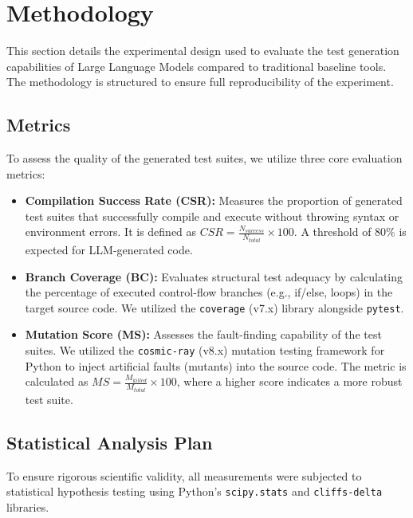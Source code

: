 \section{Methodology}
\label{sec:methodology}

This section details the experimental design used to evaluate the test generation capabilities of Large Language Models compared to traditional baseline tools. The methodology is structured to ensure full reproducibility of the experiment.

\subsection{Metrics}
\label{subsec:metrics}

To assess the quality of the generated test suites, we utilize three core evaluation metrics:

\begin{itemize}
    \item \textbf{Compilation Success Rate (CSR):} Measures the proportion of generated test suites that successfully compile and execute without throwing syntax or environment errors. It is defined as $CSR = \frac{N_{success}}{N_{total}} \times 100$. A threshold of $80\%$ is expected for LLM-generated code.
    \item \textbf{Branch Coverage (BC):} Evaluates structural test adequacy by calculating the percentage of executed control-flow branches (e.g., if/else, loops) in the target source code. We utilized the \texttt{coverage} (v7.x) library alongside \texttt{pytest}.
    \item \textbf{Mutation Score (MS):} Assesses the fault-finding capability of the test suites. We utilized the \texttt{cosmic-ray} (v8.x) mutation testing framework for Python to inject artificial faults (mutants) into the source code. The metric is calculated as $MS = \frac{M_{killed}}{M_{total}} \times 100$, where a higher score indicates a more robust test suite. \cite{demillo1978hints}
\end{itemize}

\subsection{Statistical Analysis Plan}
\label{subsec:statistics}

To ensure rigorous scientific validity, all measurements were subjected to statistical hypothesis testing using Python's \texttt{scipy.stats} and \texttt{cliffs-delta} libraries.

